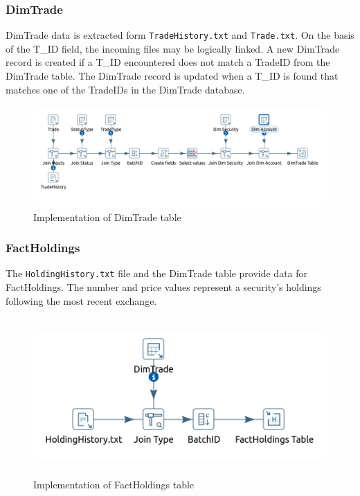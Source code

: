 \documentclass{article}
\newcommand\pcw[1]{\texttt{#1}}
\begin{document}
\subsubsection{DimTrade}
DimTrade data is extracted form \pcw{TradeHistory.txt} and \pcw{Trade.txt}. On the basis of the T\_ID field, the incoming files may be logically linked. A new DimTrade record is created if a T\_ID encountered does not match a TradeID from the DimTrade table. The DimTrade record is updated when a T\_ID is found that matches one of the TradeIDs in the DimTrade database. 
\begin{figure}[H] 
\begin{center}
\includegraphics[width=15cm]{images2/DimTRD.png}
\end{center}
\caption{Implementation of DimTrade table}
\label{DimAcc}
\end{figure} 

\subsubsection{FactHoldings}
The \pcw{HoldingHistory.txt} file and the DimTrade table provide data for FactHoldings.
The number and price values represent a security's holdings following the most recent exchange. 
\begin{figure}[H] 
\begin{center}
\includegraphics[width=15cm, height=6cm]{images2/factHold.png}
\end{center}
\caption{Implementation of FactHoldings table}
\label{fctHold}
\end{figure} 
\end{document}
